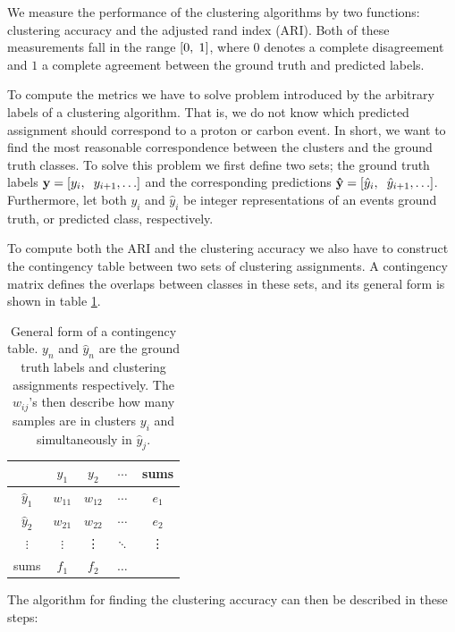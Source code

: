 \documentclass[review,number,sort&compress]{elsarticle}
\begin{document}
We measure the performance of the clustering algorithms by two functions: clustering accuracy and the adjusted rand index (ARI)\cite{Hubert1985}. Both of these measurements fall in the range $ [0, \hspace{0.1cm}1]$, where $0$ denotes a complete disagreement and $1$ a complete agreement between the ground truth and predicted labels.

To compute the metrics we have to solve problem introduced by the arbitrary labels of a clustering algorithm. That is, we do not know which predicted assignment should correspond to a proton or carbon event. In short, we want to find the most reasonable correspondence between the clusters and the ground truth classes. To solve this problem we first define two sets; the ground truth labels $\mathbf{y} = [y_i, \hspace{0.2cm} y_{i +1}, \ldots]$ and the corresponding predictions $\mathbf{\hat{y}} = [\hat{y}_i, \hspace{0.2cm} \hat{y}_{i +1}, \ldots]$. Furthermore, let both $y_i$ and $\hat{y}_i$ be integer representations of an events ground truth, or predicted class, respectively. 

To compute both the ARI and the clustering accuracy we also have to construct the contingency table between two sets of clustering assignments. A contingency matrix defines the overlaps between classes in these sets, and its general form is shown in table \ref{tab:contingency}.

\begin{table}[H]
\centering
\caption{General form of a contingency table. $y_n$ and $\hat{y}_n$ are the ground truth labels and clustering assignments respectively. The $w_{ij}$'s then describe how many samples are in clusters $y_i$ and simultaneously in $\hat{y}_j$.}\label{tab:contingency}
\begin{tabular}{c|ccc|c}
& $y_1$ &$y_2$ & $\cdots$ & sums \\
\midrule
$\hat{y}_1$ & $w_{11}$ & $w_{12}$ &  $\cdots$ & $e_1$ \\
$\hat{y}_2$ & $w_{21}$ & $w_{22}$ &  $\cdots$ & $e_2$\\
$\vdots$ & $\vdots$ & \vdots & $\ddots$ & \vdots \\
\hline
sums & $f_1$ & $f_2$ & $\hdots$ 
\end{tabular}
\end{table}

The algorithm for finding the clustering accuracy can then be described in these steps: 
\end{document}
